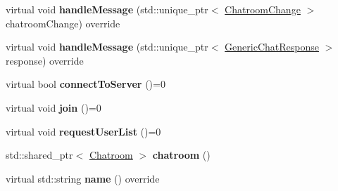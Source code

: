 \begin{DoxyCompactItemize}
\item 
\hypertarget{classSimpleChat_1_1ChatClient_a5d5645f4e9f2915b273b7cb60bbc61de}{virtual void {\bfseries handle\-Message} (std\-::unique\-\_\-ptr$<$ \hyperlink{classSimpleChat_1_1ChatroomChange}{Chatroom\-Change} $>$ chatroom\-Change) override}\label{classSimpleChat_1_1ChatClient_a5d5645f4e9f2915b273b7cb60bbc61de}

\item 
\hypertarget{classSimpleChat_1_1ChatClient_a5022c5d4eced511bcd127c53e1442b21}{virtual void {\bfseries handle\-Message} (std\-::unique\-\_\-ptr$<$ \hyperlink{classSimpleChat_1_1GenericChatResponse}{Generic\-Chat\-Response} $>$ response) override}\label{classSimpleChat_1_1ChatClient_a5022c5d4eced511bcd127c53e1442b21}

\item 
\hypertarget{classSimpleChat_1_1ChatClient_ae7f07c0ce640dc5d379914ecab79af3c}{virtual bool {\bfseries connect\-To\-Server} ()=0}\label{classSimpleChat_1_1ChatClient_ae7f07c0ce640dc5d379914ecab79af3c}

\item 
\hypertarget{classSimpleChat_1_1ChatClient_ade4303abd1dc4a069b088976d310f696}{virtual void {\bfseries join} ()=0}\label{classSimpleChat_1_1ChatClient_ade4303abd1dc4a069b088976d310f696}

\item 
\hypertarget{classSimpleChat_1_1ChatClient_a7ab65b6cf92b058242c9a163afa89fd8}{virtual void {\bfseries request\-User\-List} ()=0}\label{classSimpleChat_1_1ChatClient_a7ab65b6cf92b058242c9a163afa89fd8}

\item 
\hypertarget{classSimpleChat_1_1ChatClient_a15fc2e659a8d36d3012127e0abf37b8f}{std\-::shared\-\_\-ptr$<$ \hyperlink{classSimpleChat_1_1Chatroom}{Chatroom} $>$ {\bfseries chatroom} ()}\label{classSimpleChat_1_1ChatClient_a15fc2e659a8d36d3012127e0abf37b8f}

\item 
\hypertarget{classSimpleChat_1_1ChatClient_a321f3bb9f9254740731b22babe4bc744}{virtual std\-::string {\bfseries name} () override}\label{classSimpleChat_1_1ChatClient_a321f3bb9f9254740731b22babe4bc744}

\end{DoxyCompactItemize}
